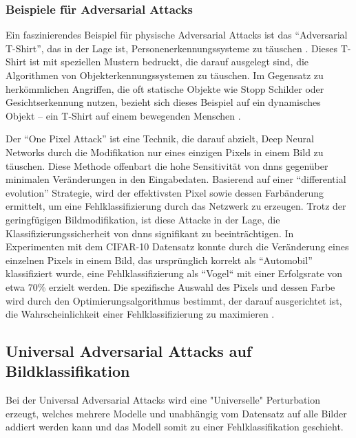 \subsubsection{Beispiele für Adversarial Attacks} 


Ein faszinierendes Beispiel für physische Adversarial Attacks ist das  ``Adversarial T-Shirt'', das in der Lage ist, Personenerkennungssysteme zu täuschen \cite{xu_adversarial_2020}. Dieses T-Shirt ist mit speziellen Mustern bedruckt, die darauf ausgelegt sind, die Algorithmen von Objekterkennungssystemen zu täuschen. Im Gegensatz zu herkömmlichen Angriffen, die oft statische Objekte wie Stopp Schilder oder Gesichtserkennung nutzen, bezieht sich dieses Beispiel auf ein dynamisches Objekt – ein T-Shirt auf einem bewegenden Menschen \cite{xu_adversarial_2020}. 

Der ``One Pixel Attack'' \cite{su_one_2019} ist eine Technik, die darauf abzielt, Deep Neural Networks durch die Modifikation nur eines einzigen Pixels in einem Bild zu täuschen. Diese Methode offenbart die hohe Sensitivität von \acrlong{dnn}s gegenüber minimalen Veränderungen in den Eingabedaten. Basierend auf einer ``differential evolution'' Strategie, wird der effektivsten Pixel sowie dessen Farbänderung ermittelt, um eine Fehlklassifizierung durch das Netzwerk zu erzeugen. Trotz der geringfügigen Bildmodifikation, ist diese Attacke in der Lage, die Klassifizierungssicherheit von \acrlong{dnn}s signifikant zu beeinträchtigen.
In Experimenten mit dem CIFAR-10 Datensatz konnte durch die Veränderung eines einzelnen Pixels in einem Bild, das ursprünglich korrekt als ``Automobil'' klassifiziert wurde, eine Fehlklassifizierung als ``Vogel`` mit einer Erfolgsrate von etwa 70\% erzielt werden. Die spezifische Auswahl des Pixels und dessen Farbe wird durch den Optimierungsalgorithmus bestimmt, der darauf ausgerichtet ist, die Wahrscheinlichkeit einer Fehlklassifizierung zu maximieren .

\subsection{Universal Adversarial Attacks auf Bildklassifikation} 

Bei der Universal Adversarial Attacks wird eine "Universelle" Perturbation erzeugt, welches mehrere Modelle und unabhängig vom Datensatz auf alle Bilder addiert werden kann und das Modell somit zu einer Fehlklassifikation geschieht. 

